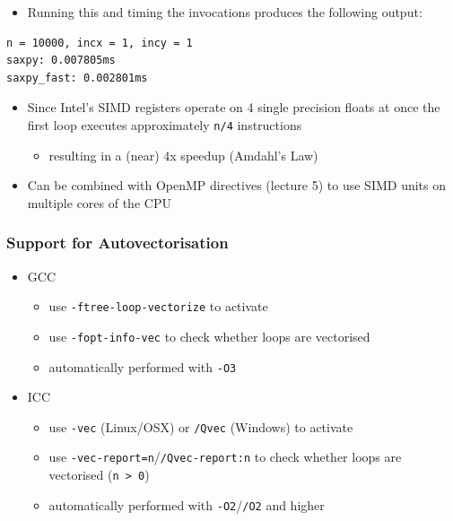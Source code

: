 \begin{itemize}
\itemsep1pt\parskip0pt
\item
  Running this and timing the invocations produces the following output:
\end{itemize}

\begin{verbatim}
n = 10000, incx = 1, incy = 1
saxpy: 0.007805ms
saxpy_fast: 0.002801ms
\end{verbatim}

\begin{itemize}
\itemsep1pt\parskip0pt
\item
  Since Intel's SIMD registers operate on 4 single precision floats at
  once the first loop executes approximately \texttt{n/4} instructions

  \begin{itemize}
  \itemsep1pt\parskip0pt
  \item
    resulting in a (near) 4x speedup (Amdahl's Law)
  \end{itemize}
\item
  Can be combined with OpenMP directives (lecture 5) to use SIMD units
  on multiple cores of the CPU
\end{itemize}

\subsubsection{Support for
Autovectorisation}\label{support-for-autovectorisation}

\begin{itemize}
\itemsep1pt\parskip0pt
\item
  GCC

  \begin{itemize}
  \itemsep1pt\parskip0pt
  \item
    use \texttt{-ftree-loop-vectorize} to activate
  \item
    use \texttt{-fopt-info-vec} to check whether loops are vectorised
  \item
    automatically performed with \texttt{-O3}
  \end{itemize}
\item
  ICC

  \begin{itemize}
  \itemsep1pt\parskip0pt
  \item
    use \texttt{-vec} (Linux/OSX) or \texttt{/Qvec} (Windows) to
    activate
  \item
    use \texttt{-vec-report=n}/\texttt{/Qvec-report:n} to check whether
    loops are vectorised (\texttt{n \textgreater{} 0})
  \item
    automatically performed with \texttt{-O2}/\texttt{/O2} and higher
  \end{itemize}
\end{itemize}

